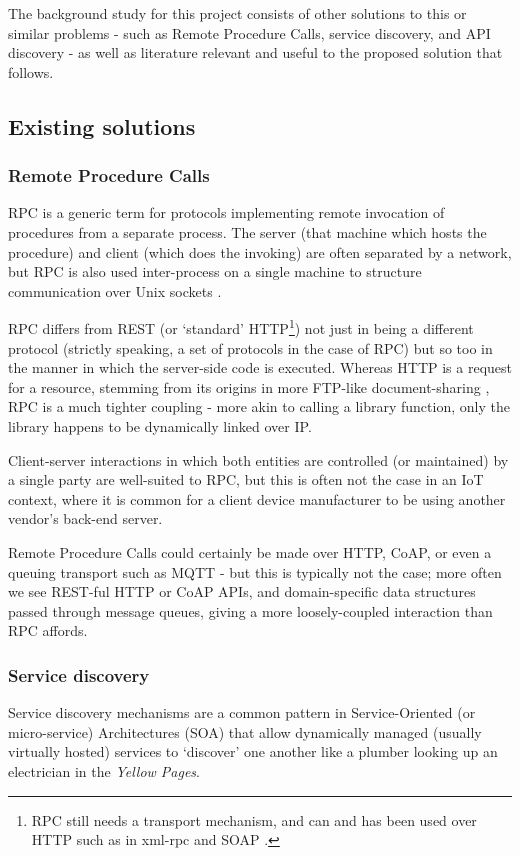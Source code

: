 The background study for this project consists of other solutions to this or similar problems - such as Remote Procedure Calls, service discovery, and API discovery - as well as literature relevant and useful to the proposed solution that follows.

\subsection{Existing solutions}\label{existing-solutions}
\subsubsection{Remote Procedure Calls}\label{rpc}
RPC is a generic term for protocols implementing remote invocation of procedures from a separate process. The server (that machine which hosts the procedure) and client (which does the invoking) are often separated by a network, but RPC is also used inter-process on a single machine to structure communication over Unix sockets \cite{rpc_unix_sockets}.

RPC differs from REST (or `standard' HTTP\footnote{RPC still needs a transport mechanism, and can and has been used over HTTP such as in xml-rpc \cite{xml-rpc} and SOAP \cite{ietf-soap-draft}.}) not just in being a different protocol (strictly speaking, a set of protocols in the case of RPC) but so too in the manner in which the server-side code is executed. Whereas HTTP is a request for a resource, stemming from its origins in more FTP-like document-sharing \cite{http_history, http_vs_ftp}, RPC is a much tighter coupling - more akin to calling a library function, only the library happens to be dynamically linked over IP.

Client-server interactions in which both entities are controlled (or maintained) by a single party are well-suited to RPC, but this is often not the case in an IoT context, where it is common for a client device manufacturer to be using another vendor's back-end server.

Remote Procedure Calls could certainly be made over HTTP, CoAP, or even a queuing transport such as MQTT \cite{mqtt-rpc} - but this is typically not the case; more often we see REST-ful HTTP or CoAP APIs, and domain-specific data structures passed through message queues, giving a more loosely-coupled interaction than RPC affords.

\subsubsection{Service discovery}\label{service-discovery}
Service discovery mechanisms are a common pattern in Service-Oriented (or micro-service) Architectures (SOA) that allow dynamically managed (usually virtually hosted) services to `discover' one another like a plumber looking up an electrician in the \emph{Yellow Pages}. 

